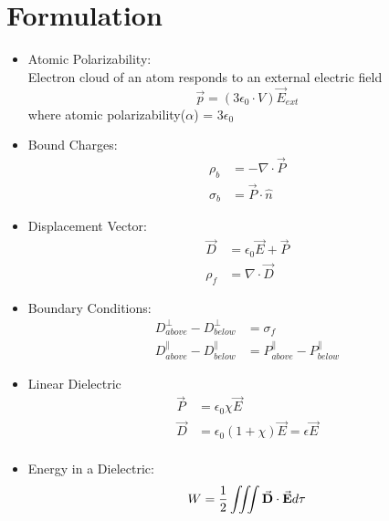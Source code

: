 \documentclass[12pt, oneside]{book}
\begin{document}
\section{Formulation}
\begin{tcolorbox}[colback=yellow!5!white,colframe=yellow!50!black]
	\begin{itemize}
	    \item Atomic Polarizability: \\
	    Electron cloud of an atom responds to an external electric field
	    \begin{equation}
	        \Vec{p} = (3\epsilon_0\cdot V)\Vec{E}_{ext}
	    \end{equation}
	    where atomic polarizability($\alpha$) = $3\epsilon_0$
	    
	    \item Bound Charges:
	    \begin{align}
	        \rho_b &= -\nabla\cdot\Vec{P} \\
	        \sigma_b &= \Vec{P}\cdot\hat{n}
	    \end{align}
	    
	    \item Displacement Vector:
	    \begin{align}
	        \Vec{D} &= \epsilon_0\Vec{E}+\Vec{P} \\
	        \rho_f &= \nabla\cdot\Vec{D}
	    \end{align}
	    \item Boundary Conditions:
	    \begin{align}
	        D_{above}^{\perp} - D_{below}^{\perp} &= \sigma_f\\
			D_{above}^{\parallel}-D_{below}^{\parallel}&=	P_{above}^{\parallel}-P_{below}^{\parallel}
	    \end{align}
	    \item Linear Dielectric
	    \begin{align}
	        \Vec{P} &= \epsilon_0\chi\vec{E} \\
	        \Vec{D} &= \epsilon_0(1+\chi)\vec{E} = \epsilon\Vec{E} \\
	    \end{align}
	    \item Energy in a Dielectric:
	    \begin{equation}
	        W = \frac{1}{2}\iiint \va{D}\cdot\va{E}d\tau
	    \end{equation}
	\end{itemize}
\end{tcolorbox}
\end{document}
